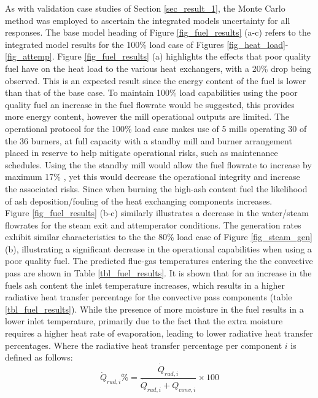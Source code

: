 \documentclass[a4paper,fleqn]{cas-sc}
\begin{document}
As with validation case studies of Section \ref{sec_result_1}, the Monte Carlo method was employed to ascertain the integrated models uncertainty for all responses. The base model heading of Figure \ref{fig_fuel_results} (a-c) refers to the integrated model results for the 100\% load case of Figures \ref{fig_heat_load}-\ref{fig_attemp}. Figure \ref{fig_fuel_results}  (a) highlights the effects that poor quality fuel have on the heat load to the various heat exchangers, with a 20\% drop being observed. This is an expected result since the energy content of the fuel is lower than that of the base case. To maintain 100\% load capabilities using the poor quality fuel an increase in the fuel flowrate would be suggested, this provides more energy content, however the mill operational outputs are limited. The operational protocol for the 100\% load case makes use of 5 mills operating 30 of the 36 burners, at full capacity with a standby mill and burner arrangement placed in reserve to help mitigate operational risks, such as maintenance schedules. Using the the standby mill would allow the fuel flowrate to increase by maximum 17\% , yet this would decrease the operational integrity and increase the associated risks. Since when burning the high-ash content fuel the likelihood of ash deposition/fouling of the heat exchanging components increases.\\

Figure \ref{fig_fuel_results} (b-c) similarly illustrates a decrease in the water/steam flowrates for the steam exit and attemperator conditions. The generation rates exhibit similar characteristics to the the 80\% load case of Figure \ref{fig_steam_gen} (b), illustrating a significant decrease in the operational capabilities when using a poor quality fuel. The predicted flue-gas temperatures entering the the convective pass are shown in Table \ref{tbl_fuel_results}. It is shown that for an increase in the fuels ash content the inlet temperature increases, which results in a higher radiative heat transfer percentage for the convective pass components (table \ref{tbl_fuel_results}). While the presence of more moisture in the fuel results in a lower inlet temperature, primarily due to the fact that the extra moisture requires a higher heat rate of evaporation, leading to lower radiative heat transfer percentages. Where the radiative heat transfer percentage per component $i$ is defined as follows: \\
\begin{equation}
\dot{Q}_{rad,i}\% = \frac{\dot{Q}_{rad,i}}{\dot{Q}_{rad,i}+\dot{Q}_{conv,i}}\times 100
\end{equation}
\end{document}
